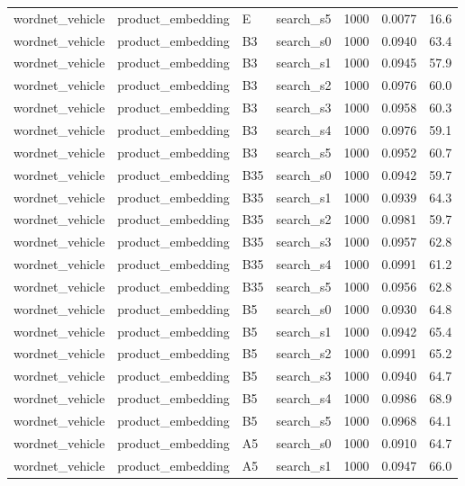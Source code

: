 \begin{longtable}{llllrrr}
wordnet\_vehicle & product\_embedding & E & search\_s5 & 1000 & 0.0077 & 16.6 \\
wordnet\_vehicle & product\_embedding & B3 & search\_s0 & 1000 & 0.0940 & 63.4 \\
wordnet\_vehicle & product\_embedding & B3 & search\_s1 & 1000 & 0.0945 & 57.9 \\
wordnet\_vehicle & product\_embedding & B3 & search\_s2 & 1000 & 0.0976 & 60.0 \\
wordnet\_vehicle & product\_embedding & B3 & search\_s3 & 1000 & 0.0958 & 60.3 \\
wordnet\_vehicle & product\_embedding & B3 & search\_s4 & 1000 & 0.0976 & 59.1 \\
wordnet\_vehicle & product\_embedding & B3 & search\_s5 & 1000 & 0.0952 & 60.7 \\
wordnet\_vehicle & product\_embedding & B35 & search\_s0 & 1000 & 0.0942 & 59.7 \\
wordnet\_vehicle & product\_embedding & B35 & search\_s1 & 1000 & 0.0939 & 64.3 \\
wordnet\_vehicle & product\_embedding & B35 & search\_s2 & 1000 & 0.0981 & 59.7 \\
wordnet\_vehicle & product\_embedding & B35 & search\_s3 & 1000 & 0.0957 & 62.8 \\
wordnet\_vehicle & product\_embedding & B35 & search\_s4 & 1000 & 0.0991 & 61.2 \\
wordnet\_vehicle & product\_embedding & B35 & search\_s5 & 1000 & 0.0956 & 62.8 \\
\rowcolor{oursbg}
wordnet\_vehicle & product\_embedding & B5 & search\_s0 & 1000 & 0.0930 & 64.8 \\
\rowcolor{oursbg}
wordnet\_vehicle & product\_embedding & B5 & search\_s1 & 1000 & 0.0942 & 65.4 \\
\rowcolor{oursbg}
wordnet\_vehicle & product\_embedding & B5 & search\_s2 & 1000 & 0.0991 & 65.2 \\
\rowcolor{oursbg}
wordnet\_vehicle & product\_embedding & B5 & search\_s3 & 1000 & 0.0940 & 64.7 \\
\rowcolor{oursbg}
wordnet\_vehicle & product\_embedding & B5 & search\_s4 & 1000 & 0.0986 & 68.9 \\
\rowcolor{oursbg}
wordnet\_vehicle & product\_embedding & B5 & search\_s5 & 1000 & 0.0968 & 64.1 \\
wordnet\_vehicle & product\_embedding & A5 & search\_s0 & 1000 & 0.0910 & 64.7 \\
wordnet\_vehicle & product\_embedding & A5 & search\_s1 & 1000 & 0.0947 & 66.0 \\

\end{longtable}
